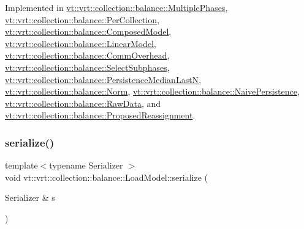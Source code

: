 Implemented in \hyperlink{structvt_1_1vrt_1_1collection_1_1balance_1_1_multiple_phases_aebe7b174623cffe8f4790e32e15859ff}{vt\+::vrt\+::collection\+::balance\+::\+Multiple\+Phases}, \hyperlink{structvt_1_1vrt_1_1collection_1_1balance_1_1_per_collection_abe527a6f5cd861eb21c251d7d6afad0f}{vt\+::vrt\+::collection\+::balance\+::\+Per\+Collection}, \hyperlink{classvt_1_1vrt_1_1collection_1_1balance_1_1_composed_model_a9410479ba5a5950fd56bb076717e48e5}{vt\+::vrt\+::collection\+::balance\+::\+Composed\+Model}, \hyperlink{structvt_1_1vrt_1_1collection_1_1balance_1_1_linear_model_a98bafaac5ddbf41d2589a8efeb3da37a}{vt\+::vrt\+::collection\+::balance\+::\+Linear\+Model}, \hyperlink{structvt_1_1vrt_1_1collection_1_1balance_1_1_comm_overhead_a16fbdbf4ab0e682ea391c820aac530a9}{vt\+::vrt\+::collection\+::balance\+::\+Comm\+Overhead}, \hyperlink{classvt_1_1vrt_1_1collection_1_1balance_1_1_select_subphases_a77cf76f7699c9480483cb4104bf58965}{vt\+::vrt\+::collection\+::balance\+::\+Select\+Subphases}, \hyperlink{structvt_1_1vrt_1_1collection_1_1balance_1_1_persistence_median_last_n_a905b84cb14c5326bdce4b761e4fd3106}{vt\+::vrt\+::collection\+::balance\+::\+Persistence\+Median\+LastN}, \hyperlink{classvt_1_1vrt_1_1collection_1_1balance_1_1_norm_ae703c9f02a514a1d7f130daea2367566}{vt\+::vrt\+::collection\+::balance\+::\+Norm}, \hyperlink{structvt_1_1vrt_1_1collection_1_1balance_1_1_naive_persistence_ac693e6aad2e2c11815e56b2530e9c97e}{vt\+::vrt\+::collection\+::balance\+::\+Naive\+Persistence}, \hyperlink{structvt_1_1vrt_1_1collection_1_1balance_1_1_raw_data_a2fc0e286efee8f9950a7a8ff13f3261d}{vt\+::vrt\+::collection\+::balance\+::\+Raw\+Data}, and \hyperlink{structvt_1_1vrt_1_1collection_1_1balance_1_1_proposed_reassignment_ac865e7afd9b830328a31b947aed65f05}{vt\+::vrt\+::collection\+::balance\+::\+Proposed\+Reassignment}.

\mbox{\label{structvt_1_1vrt_1_1collection_1_1balance_1_1_load_model_a52e2210225947697a235b75c385eb104}} 
\subsubsection{\texorpdfstring{serialize()}{serialize()}}
{\footnotesize\ttfamily template$<$typename Serializer $>$ \\
void vt\+::vrt\+::collection\+::balance\+::\+Load\+Model\+::serialize (\begin{DoxyParamCaption}\item[{Serializer \&}]{s }\end{DoxyParamCaption})\hspace{0.3cm}{\ttfamily [inline]}}


